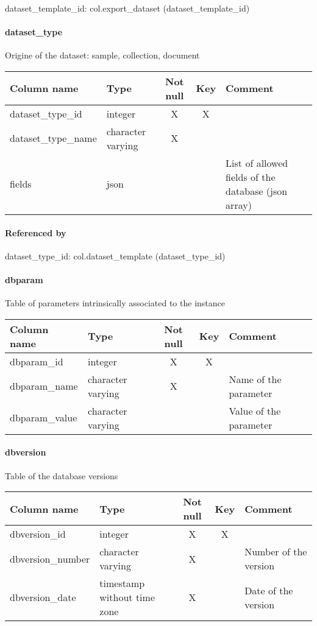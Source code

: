 dataset\_template\_id: col.export\_dataset (dataset\_template\_id)

\paragraph{dataset\_type}
Origine of the dataset: sample, collection, document

\begin{tabular}{|l| p{2cm}|c|c| p{5cm}|}
\hline
Column name & Type & Not null & Key & Comment \\
\hline
dataset\_type\_id & integer & X & X & \\
dataset\_type\_name & character varying & X &  & \\
fields & json &  &  & List of allowed fields of the database (json array)\\
\hline
\end{tabular}
\paragraph{Referenced by}
dataset\_type\_id: col.dataset\_template (dataset\_type\_id)

\paragraph{dbparam}
Table of parameters intrinsically associated to the instance

\begin{tabular}{|l| p{2cm}|c|c| p{5cm}|}
\hline
Column name & Type & Not null & Key & Comment \\
\hline
dbparam\_id & integer & X & X & \\
dbparam\_name & character varying & X &  & Name of the parameter\\
dbparam\_value & character varying &  &  & Value of the parameter\\
\hline
\end{tabular}
\paragraph{dbversion}
Table of the database versions

\begin{tabular}{|l| p{2cm}|c|c| p{5cm}|}
\hline
Column name & Type & Not null & Key & Comment \\
\hline
dbversion\_id & integer & X & X & \\
dbversion\_number & character varying & X &  & Number of the version\\
dbversion\_date & timestamp without time zone & X &  & Date of the version\\
\hline
\end{tabular}
